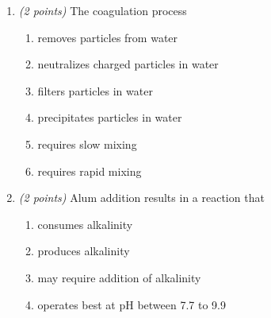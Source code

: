\documentclass[12pt,letterpaper]{article}
\begin{document}
\begin{enumerate}
\begin{enumerate}

\item \emph{(2 points)} The coagulation process
\begin{enumerate}
\item removes particles from water
\item neutralizes charged particles in water
\item filters particles in water
\item precipitates particles in water
\item requires slow mixing
\item requires rapid mixing
\end{enumerate} 

\vspace{0.1in}

\item \emph{(2 points)} Alum addition results in a reaction that 
\begin{enumerate}
\item consumes alkalinity
\item produces alkalinity
\item may require addition of alkalinity
\item operates best at pH between 7.7 to 9.9
\end{enumerate}



\end{enumerate}


\end{enumerate}
\end{document}
